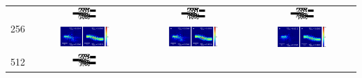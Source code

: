 \begin{landscape}
\begin{table}[ht]
\begin{tabular}{|c|c|c|c|}
    \hline
      \multirow{2}{*}{256} &
      \includegraphics[width=0.24\textwidth]{image/results/wdm/L-BFGS-B/visualize_eps_cont_256.png} &
      \includegraphics[width=0.24\textwidth]{image/results/wdm/L-BFGS-B/visualize_eps_disc_256.png} &
      \includegraphics[width=0.24\textwidth]{image/results/wdm/L-BFGS-B/visualize_eps_fab_256.png} \\
      \cline{2-4}
      &
      \includegraphics[width=0.50\textwidth]{image/results/wdm/L-BFGS-B/visualize_field_cont_256.png} &
      \includegraphics[width=0.50\textwidth]{image/results/wdm/L-BFGS-B/visualize_field_disc_256.png} &
      \includegraphics[width=0.50\textwidth]{image/results/wdm/L-BFGS-B/visualize_field_fab_256.png} \\
    \hline
      \multirow{2}{*}{512} &
      \includegraphics[width=0.24\textwidth]{image/results/wdm/L-BFGS-B/visualize_eps_cont_512.png} &

\end{tabular}
\end{table}
\end{landscape}
